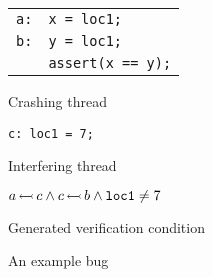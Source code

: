 \begin{figure}
  {\hfill}
  \begin{subfloat}
    \parbox{4cm}{
      \begin{tabular}{ll}
        {\tt a:} & {\tt x = loc1;}\\
        {\tt b:} & {\tt y = loc1;}\\
        & {\tt assert(x == y);}
      \end{tabular}
    }
    \caption{Crashing thread}
  \end{subfloat}
  {\hfill}
  \begin{subfloat}
    \parbox{3.2cm}{\tt c: loc1 = 7;}
    \vspace{24pt}
    \caption{Interfering thread}
  \end{subfloat}
  {\hfill}
  \begin{subfloat}
    $a\,{\leftarrowtail}\,c \wedge c\,{\leftarrowtail}\,b \wedge \mathtt{loc1} \not= 7$
    \caption{Generated verification condition}
  \end{subfloat}
  {\hfill}
  \caption{An example bug}
  \label{fig:enforcement:example_bug}
\end{figure}

